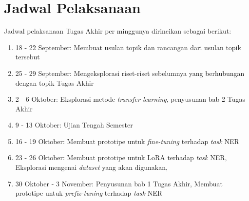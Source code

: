 \section{Jadwal Pelaksanaan}

Jadwal pelaksanaan Tugas Akhir per minggunya dirincikan sebagai berikut:
\begin{enumerate}
    \item 18 - 22 September: Membuat usulan topik dan rancangan dari usulan topik
    tersebut
    \item 25 - 29 September: Mengeksplorasi riset-riset sebelumnya yang
    berhubungan dengan topik Tugas Akhir
    \item 2 - 6 Oktober: Eksplorasi metode \textit{transfer learning}, penyusunan bab 2 Tugas
    Akhir
    \item 9 - 13 Oktober: Ujian Tengah Semester
    \item 16 - 19 Oktober: Membuat prototipe untuk \textit{fine-tuning} terhadap \textit{task} NER
    \item 23 - 26 Oktober: Membuat prototipe untuk LoRA terhadap \textit{task} NER, Eksplorasi mengenai \textit{dataset} yang akan digunakan, 
    \item 30 Oktober - 3 November: Penyusunan bab 1 Tugas Akhir, Membuat prototipe untuk \textit{prefix-tuning} terhadap \textit{task} NER
\end{enumerate}